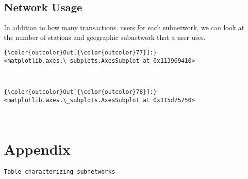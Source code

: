 \documentclass{report}
\begin{document}
    \subsection{Network Usage}\label{network-usage}

In addition to how many transactions, users for each subnetwork, we can
look at the number of stations and geographic subnetwork that a user
uses.


            \begin{Verbatim}[commandchars=\\\{\}]
{\color{outcolor}Out[{\color{outcolor}77}]:} <matplotlib.axes.\_subplots.AxesSubplot at 0x113969410>
\end{Verbatim}
        
    \begin{center}
    \end{center}
    { \hspace*{\fill} \\}
    

            \begin{Verbatim}[commandchars=\\\{\}]
{\color{outcolor}Out[{\color{outcolor}78}]:} <matplotlib.axes.\_subplots.AxesSubplot at 0x115d75750>
\end{Verbatim}
        
    \begin{center}
    \end{center}
    { \hspace*{\fill} \\}
    
    \section{Appendix}\label{appendix}


    \begin{Verbatim}[commandchars=\\\{\}]
Table characterizing subnetworks
    \end{Verbatim}
\end{document}
